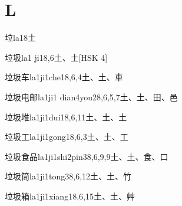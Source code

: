 
\section*{L}

\begin{EntryWithPhonetic}{垃}{la1}{8}{⼟}
\end{EntryWithPhonetic}

\begin{EntryWithPhonetic}{垃圾}{la1 ji1}{8,6}{⼟、⼟}[HSK 4]
\end{EntryWithPhonetic}

\begin{EntryWithPhonetic}{垃圾车}{la1ji1che1}{8,6,4}{⼟、⼟、⾞}
\end{EntryWithPhonetic}

\begin{EntryWithPhonetic}{垃圾电邮}{la1ji1 dian4you2}{8,6,5,7}{⼟、⼟、⽥、⾢}
\end{EntryWithPhonetic}

\begin{EntryWithPhonetic}{垃圾堆}{la1ji1dui1}{8,6,11}{⼟、⼟、⼟}
\end{EntryWithPhonetic}

\begin{EntryWithPhonetic}{垃圾工}{la1ji1gong1}{8,6,3}{⼟、⼟、⼯}
\end{EntryWithPhonetic}

\begin{EntryWithPhonetic}{垃圾食品}{la1ji1shi2pin3}{8,6,9,9}{⼟、⼟、⾷、⼝}
\end{EntryWithPhonetic}

\begin{EntryWithPhonetic}{垃圾筒}{la1ji1tong3}{8,6,12}{⼟、⼟、⽵}
\end{EntryWithPhonetic}

\begin{EntryWithPhonetic}{垃圾箱}{la1ji1xiang1}{8,6,15}{⼟、⼟、⾋}
\end{EntryWithPhonetic}

